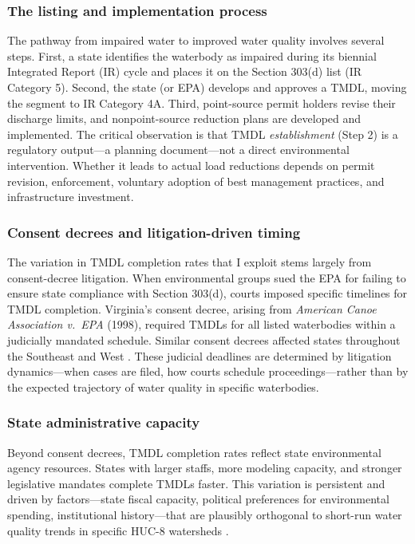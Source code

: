 \documentclass[12pt]{article}
\begin{document}
\subsubsection*{The listing and implementation process} The pathway from impaired water to improved water quality involves several steps. First, a state identifies the waterbody as impaired during its biennial Integrated Report (IR) cycle and places it on the Section 303(d) list (IR Category 5). Second, the state (or EPA) develops and approves a TMDL, moving the segment to IR Category 4A. Third, point-source permit holders revise their discharge limits, and nonpoint-source reduction plans are developed and implemented. The critical observation is that TMDL \textit{establishment} (Step 2) is a regulatory output---a planning document---not a direct environmental intervention. Whether it leads to actual load reductions depends on permit revision, enforcement, voluntary adoption of best management practices, and infrastructure investment.

\subsubsection*{Consent decrees and litigation-driven timing} The variation in TMDL completion rates that I exploit stems largely from consent-decree litigation. When environmental groups sued the EPA for failing to ensure state compliance with Section 303(d), courts imposed specific timelines for TMDL completion. Virginia's consent decree, arising from \textit{American Canoe Association v.\ EPA} (1998), required TMDLs for all listed waterbodies within a judicially mandated schedule. Similar consent decrees affected states throughout the Southeast and West \citep{craig2012}. These judicial deadlines are determined by litigation dynamics---when cases are filed, how courts schedule proceedings---rather than by the expected trajectory of water quality in specific waterbodies.

\subsubsection*{State administrative capacity} Beyond consent decrees, TMDL completion rates reflect state environmental agency resources. States with larger staffs, more modeling capacity, and stronger legislative mandates complete TMDLs faster. This variation is persistent and driven by factors---state fiscal capacity, political preferences for environmental spending, institutional history---that are plausibly orthogonal to short-run water quality trends in specific HUC-8 watersheds \citep{herd2018}.
\end{document}
